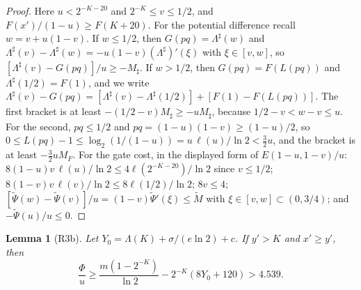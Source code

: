 \documentclass[11pt]{amsart}
\newtheorem{lemma}[theorem]{Lemma}
\theoremstyle{remark}
\begin{document}
\begin{proof}
Here $u<2^{-K-20}$ and $2^{-K}\le v\le1/2$, and $F(x')/(1-u)\ge F(K+20)$. For the potential difference recall $w=v+u(1-v)$. If $w\le1/2$, then $G(pq)=\Lambda^\sharp(w)$ and $\Lambda^\sharp(v)-\Lambda^\sharp(w)=-u(1-v)(\Lambda^\sharp)'(\xi)$ with $\xi\in[v,w]$, so $[\Lambda^\sharp(v)-G(pq)]/u\ge-M_\sharp$. If $w>1/2$, then $G(pq)=F(L(pq))$ and $\Lambda^\sharp(1/2)=F(1)$, and we write $\Lambda^\sharp(v)-G(pq)=[\Lambda^\sharp(v)-\Lambda^\sharp(1/2)]+[F(1)-F(L(pq))]$. The first bracket is at least $-(1/2-v)M_\sharp\ge-uM_\sharp$, because $1/2-v<w-v\le u$. For the second, $pq\le1/2$ and $pq=(1-u)(1-v)\ge(1-u)/2$, so $0\le L(pq)-1\le\log_2(1/(1-u))=u\,\ell(u)/\ln2<\tfrac32u$, and the bracket is at least $-\tfrac32uM_F$. For the gate cost, in the displayed form of $E(1-u,1-v)/u$: $8(1-u)v\,\ell(u)/\ln2\le4\ell(2^{-K-20})/\ln2$ since $v\le1/2$; $8(1-v)v\,\ell(v)/\ln2\le8\ell(1/2)/\ln2$; $8v\le4$; $[\widetilde\Psi(w)-\widetilde\Psi(v)]/u=(1-v)\widetilde\Psi'(\xi)\le\widetilde M$ with $\xi\in[v,w]\subset(0,3/4)$; and $-\widetilde\Psi(u)/u\le0$.
\end{proof}

\begin{lemma}[R3b]\label{lem:R3b}
Let $Y_0=\Lambda(K)+\sigma/(e\ln2)+c$. If $y'>K$ and $x'\ge y'$, then
\[
\frac{\Phi}{u}\ge\frac{m(1-2^{-K})}{\ln2}-2^{-K}(8Y_0+120)>4.539.
\]
\end{lemma}
\end{document}
